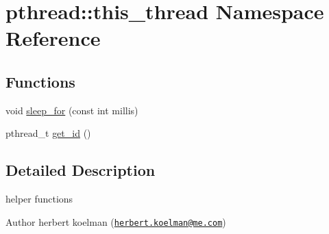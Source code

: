 \hypertarget{namespacepthread_1_1this__thread}{}\section{pthread\+:\+:this\+\_\+thread Namespace Reference}
\label{namespacepthread_1_1this__thread}
\subsection*{Functions}
\begin{DoxyCompactItemize}
\item 
void \hyperlink{group__threads_ga01ae1b738d3d2dbbfe966b4aad07a0a9}{sleep\+\_\+for} (const int millis)
\item 
pthread\+\_\+t \hyperlink{group__threads_ga57275c7fa3dd5591c7f19ccf451f1fb6}{get\+\_\+id} ()
\end{DoxyCompactItemize}


\subsection{Detailed Description}
helper functions \begin{DoxyAuthor}{Author}
herbert koelman (\href{mailto:herbert.koelman@me.com}{\tt herbert.\+koelman@me.\+com}) 
\end{DoxyAuthor}

